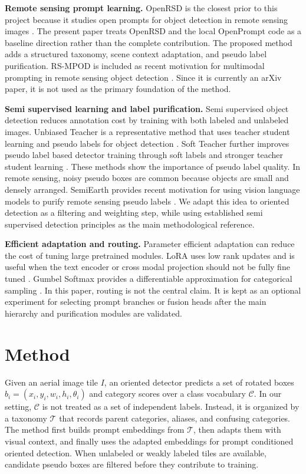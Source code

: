\documentclass[10pt]{article}
\begin{document}
\textbf{Remote sensing prompt learning.}
OpenRSD is the closest prior to this project because it studies open prompts for object detection in remote sensing images \cite{huang2025openrsd}. The present paper treats OpenRSD and the local OpenPrompt code as a baseline direction rather than the complete contribution. The proposed method adds a structured taxonomy, scene context adaptation, and pseudo label purification. RS-MPOD is included as recent motivation for multimodal prompting in remote sensing object detection \cite{rsmpod2026}. Since it is currently an arXiv paper, it is not used as the primary foundation of the method.

\textbf{Semi supervised learning and label purification.}
Semi supervised object detection reduces annotation cost by training with both labeled and unlabeled images. Unbiased Teacher is a representative method that uses teacher student learning and pseudo labels for object detection \cite{liu2021unbiased}. Soft Teacher further improves pseudo label based detector training through soft labels and stronger teacher student learning \cite{xu2021softteacher}. These methods show the importance of pseudo label quality. In remote sensing, noisy pseudo boxes are common because objects are small and densely arranged. SemiEarth provides recent motivation for using vision language models to purify remote sensing pseudo labels \cite{semiearth2026}. We adapt this idea to oriented detection as a filtering and weighting step, while using established semi supervised detection principles as the main methodological reference.

\textbf{Efficient adaptation and routing.}
Parameter efficient adaptation can reduce the cost of tuning large pretrained modules. LoRA uses low rank updates and is useful when the text encoder or cross modal projection should not be fully fine tuned \cite{hu2021lora}. Gumbel Softmax provides a differentiable approximation for categorical sampling \cite{jang2017gumbel,maddison2017concrete}. In this paper, routing is not the central claim. It is kept as an optional experiment for selecting prompt branches or fusion heads after the main hierarchy and purification modules are validated.

\section{Method}

Given an aerial image tile $I$, an oriented detector predicts a set of rotated boxes $b_i=(x_i,y_i,w_i,h_i,\theta_i)$ and category scores over a class vocabulary $\mathcal{C}$. In our setting, $\mathcal{C}$ is not treated as a set of independent labels. Instead, it is organized by a taxonomy $\mathcal{T}$ that records parent categories, aliases, and confusing categories. The method first builds prompt embeddings from $\mathcal{T}$, then adapts them with visual context, and finally uses the adapted embeddings for prompt conditioned oriented detection. When unlabeled or weakly labeled tiles are available, candidate pseudo boxes are filtered before they contribute to training.
\end{document}
